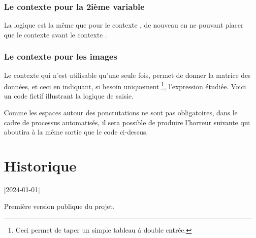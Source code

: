 \documentclass[10pt, a4paper]{article}
\begin{document}

\subsubsection{Le contexte  pour la 2ième variable}

La logique est la même que pour le contexte , de nouveau en ne pouvant placer que le contexte  avant le contexte .



\subsubsection{Le contexte  pour les images}

Le contexte  qui n'est utilisable qu'une seule fois, permet de donner la matrice des données, et ceci en indiquant, si besoin uniquement
\footnote{
	Ceci permet de taper un simple tableau à double entrée.
},
l'expression étudiée.
Voici un code fictif illustrant la logique de saisie.




Comme les espaces autour des ponctutations ne sont pas obligatoires, dans le cadre de processus automatisés, il sera possible de produire l'horreur suivante qui aboutira à la même sortie que le code ci-dessus.

\section{Historique}

[2024-01-01]

Première version publique du projet.
\end{document}
